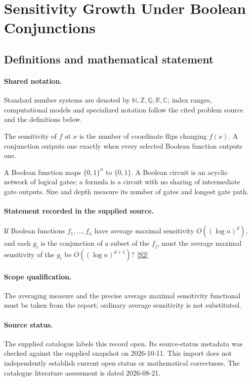 \documentclass[11pt]{article}
\newcommand{\sref}[2]{\hyperlink{source:#1:#2}{[S#2]}}
\begin{document}
\section{Sensitivity Growth Under Boolean Conjunctions}\label{statement}

\subsection{Definitions and mathematical statement}

\paragraph{Shared notation.}Standard number systems are denoted by $\mathbb N,\mathbb Z,\mathbb Q,\mathbb R,\mathbb C$; index ranges, computational models and specialized notation follow the cited problem source and the definitions below.


The sensitivity of $f$ at $x$ is the number of coordinate flips changing $f(x)$. A conjunction outputs one exactly when every selected Boolean function outputs one.

A Boolean function maps $\{0,1\}^n$ to $\{0,1\}$. A Boolean circuit is an acyclic network of logical gates; a formula is a circuit with no sharing of intermediate gate outputs. Size and depth measure its number of gates and longest gate path.
\paragraph{Statement recorded in the supplied source.}
If Boolean functions $f_1,\ldots,f_n$ have average maximal sensitivity $O((\log n)^d)$, and each $g_i$ is the conjunction of a subset of the $f_j$, must the average maximal sensitivity of the $g_i$ be $O((\log n)^{d+1})$? \sref{statement}{2}
\paragraph{Scope qualification.}
The averaging measure and the precise average maximal sensitivity functional must be taken from the report; ordinary average sensitivity is not substituted.
\paragraph{Source status.}
The supplied catalogue labels this record open. Its source-status metadata was checked against the supplied snapshot on 2026-10-11. This import does not independently establish current open status or mathematical correctness. The catalogue literature assessment is dated 2026-08-21.
\end{document}
